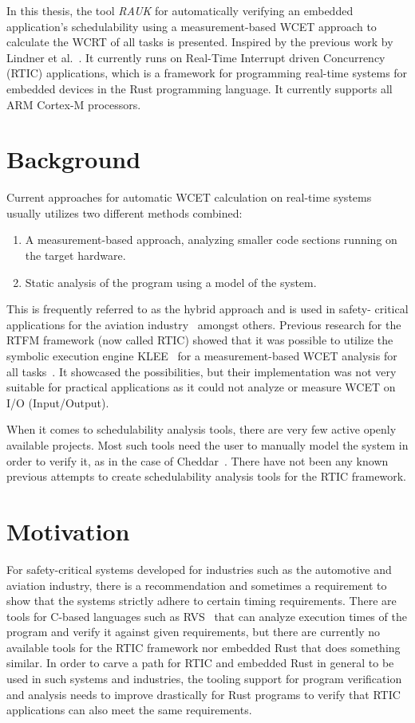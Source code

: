 In this thesis, the tool \emph{RAUK} for automatically verifying an embedded
application's schedulability using a measurement-based WCET approach to
calculate the WCRT of all tasks is presented. Inspired by the previous work by
Lindner et al.\ \cite{lindner}. It currently runs on Real-Time Interrupt driven
Concurrency (RTIC) applications, which is a framework for programming real-time
systems for embedded devices in the Rust programming language. It currently
supports all ARM Cortex-M processors.

\section{Background}
Current approaches for automatic WCET calculation on real-time systems usually
utilizes two different methods combined:
\begin{enumerate}
    \item A measurement-based approach, analyzing smaller code sections running
        on the target hardware.
    \item Static analysis of the program using a model of the system.
\end{enumerate}
This is frequently referred to as the hybrid approach and is used in safety-
critical applications for the aviation industry~\cite{rapita} amongst others.
Previous research for the RTFM framework (now called RTIC) showed that it was
possible to utilize the symbolic execution engine KLEE~\cite{kleepaper} for a
measurement-based WCET analysis for all tasks~\cite{lindner}. It showcased the
possibilities, but their implementation was not very suitable for practical
applications as it could not analyze or measure WCET on I/O (Input/Output).

When it comes to schedulability analysis tools, there are very few active openly
available projects. Most such tools need the user to manually model the system
in order to verify it, as in the case of Cheddar~\cite{cheddar}. There have not
been any known previous attempts to create schedulability analysis tools for
the RTIC framework.

\section{Motivation}
For safety-critical systems developed for industries such as the automotive and
aviation industry, there is a recommendation and sometimes a requirement to
show that the systems strictly adhere to certain timing requirements. There
are tools for C-based languages such as RVS~\cite{rapita} that can analyze
execution times of the program and verify it against given requirements, but
there are currently no available tools for the RTIC framework nor embedded Rust
that does something similar. In order to carve a path for RTIC and embedded
Rust in general to be used in such systems and industries, the tooling support
for program verification and analysis needs to improve drastically for Rust
programs to verify that RTIC applications can also meet the same requirements.

